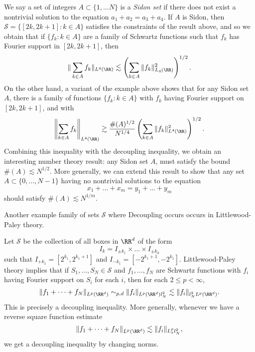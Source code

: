 \begin{remark}
  We say a set of integers $A \subset \{ 1, \dots N \}$ is a \emph{Sidon set} if there does not exist a nontrivial solution to the equation $a_1 + a_2 = a_3 + a_4$. If $A$ is Sidon, then $\mathcal{S} = \{ [2k,2k+1]: k \in A \}$ satisfies the constraints of the result above, and so we obtain that if $\{ f_k: k \in A \}$ are a family of Schwartz functions such that $f_k$ has Fourier support in $[2k,2k+1]$, then
  \[ \| \sum_{k \in A} f_k \|_{L^4(\RR)} \lesssim \left( \sum_{k \in A} \| f_k \|_{L_4(\RR)}^2 \right)^{1/2}. \]
  On the other hand, a variant of the example above shows that for any Sidon set $A$, there is a family of functions $\{ f_k : k \in A \}$ with $f_k$ having Fourier support on $[2k,2k+1]$, and with
  \[ \left\| \sum_{k \in A} f_k \right\|_{L^4(\RR)} \gtrsim \frac{\#(A)^{1/2}}{N^{1/4}} \left( \sum_{k \in A} \| f_k \|_{L^4(\RR)}^2 \right)^{1/2}. \]
  Combining this inequality with the decoupling inequality, we obtain an interesting number theory result: any Sidon set $A$, must satisfy the bound $\#(A) \lesssim N^{1/2}$. More generally, we can extend this result to show that any set $A \subset \{ 0, \dots, N-1 \}$ having no nontrivial solutions to the equation
  \[ x_1 + \dots + x_m = y_1 + \dots + y_m \]
  should satisfy $\#(A) \lesssim N^{1/m}$.
\end{remark}

Another example family of sets $\mathcal{S}$ where Decoupling occurs occurs in Littlewood-Paley theory.

\begin{theorem}
  Let $\mathcal{S}$ be the collection of all boxes in $\RR^d$ of the form
  \[ I_k = I_{\pm k_1} \times \dots \times I_{\pm k_d} \]
  such that $I_{+ k_1} = [2^{k_1}, 2^{k_1 + 1}]$ and $I_{-k_1} = [-2^{k_1+1}, -2^{k_1}]$. Littlewood-Paley theory implies that if $S_1, \dots, S_N \in \mathcal{S}$ and $f_1, \dots, f_N$ are Schwartz functions with $f_i$ having Fourier support on $S_i$ for each $i$, then for each $2 \leq p < \infty$,
  \[ \| f_1 + \dots + f_N \|_{L^p(\RR^d)} \sim_{p,d} \| f_i \|_{L^p(\RR^d) l^2_N} \lesssim \| f_i \|_{l^2_N L^p(\RR^d)}. \]
  This is precisely a decoupling inequality. More generally, whenever we have a reverse square function estimate
  \[ \| f_1 + \dots + f_N \|_{L^p(\RR^d)} \lesssim \| f_i \|_{L^p_x l^2_N}, \]
  we get a decoupling inequality by changing norms.
\end{theorem}

